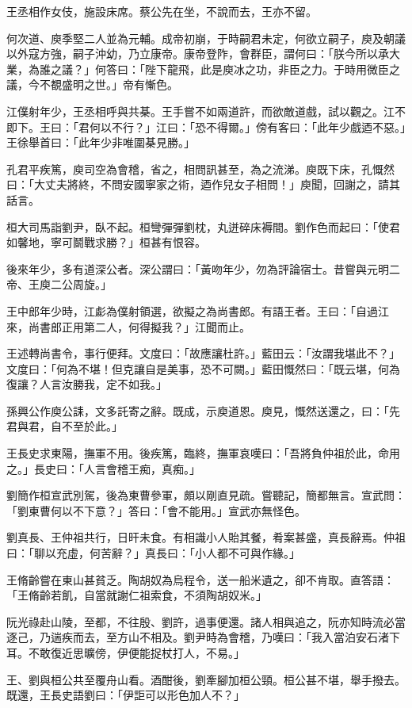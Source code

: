 王丞相作女伎，施設床席。蔡公先在坐，不說而去，王亦不留。

何次道、庾季堅二人並為元輔。成帝初崩，于時嗣君未定，何欲立嗣子，庾及朝議以外寇方強，嗣子沖幼，乃立康帝。康帝登阼，會群臣，謂何曰：「朕今所以承大業，為誰之議？」何答曰：「陛下龍飛，此是庾冰之功，非臣之力。于時用微臣之議，今不覩盛明之世。」帝有慚色。

江僕射年少，王丞相呼與共棊。王手嘗不如兩道許，而欲敵道戲，試以觀之。江不即下。王曰：「君何以不行？」江曰：「恐不得爾。」傍有客曰：「此年少戲迺不惡。」王徐舉首曰：「此年少非唯圍棊見勝。」

孔君平疾篤，庾司空為會稽，省之，相問訊甚至，為之流涕。庾既下床，孔慨然曰：「大丈夫將終，不問安國寧家之術，迺作兒女子相問！」庾聞，回謝之，請其話言。

桓大司馬詣劉尹，臥不起。桓彎彈彈劉枕，丸迸碎床褥間。劉作色而起曰：「使君如馨地，寧可鬬戰求勝？」桓甚有恨容。

後來年少，多有道深公者。深公謂曰：「黃吻年少，勿為評論宿士。昔嘗與元明二帝、王庾二公周旋。」

王中郎年少時，江虨為僕射領選，欲擬之為尚書郎。有語王者。王曰：「自過江來，尚書郎正用第二人，何得擬我？」江聞而止。

王述轉尚書令，事行便拜。文度曰：「故應讓杜許。」藍田云：「汝謂我堪此不？」文度曰：「何為不堪！但克讓自是美事，恐不可闕。」藍田慨然曰：「既云堪，何為復讓？人言汝勝我，定不如我。」

孫興公作庾公誄，文多託寄之辭。既成，示庾道恩。庾見，慨然送還之，曰：「先君與君，自不至於此。」

王長史求東陽，撫軍不用。後疾篤，臨終，撫軍哀嘆曰：「吾將負仲祖於此，命用之。」長史曰：「人言會稽王痴，真痴。」

劉簡作桓宣武別駕，後為東曹參軍，頗以剛直見疏。嘗聽記，簡都無言。宣武問：「劉東曹何以不下意？」答曰：「會不能用。」宣武亦無怪色。

劉真長、王仲祖共行，日旰未食。有相識小人貽其餐，肴案甚盛，真長辭焉。仲祖曰：「聊以充虛，何苦辭？」真長曰：「小人都不可與作緣。」

王脩齡嘗在東山甚貧乏。陶胡奴為烏程令，送一船米遺之，卻不肯取。直答語：「王脩齡若飢，自當就謝仁祖索食，不須陶胡奴米。」

阮光祿赴山陵，至都，不往殷、劉許，過事便還。諸人相與追之，阮亦知時流必當逐己，乃遄疾而去，至方山不相及。劉尹時為會稽，乃嘆曰：「我入當泊安石渚下耳。不敢復近思曠傍，伊便能捉杖打人，不易。」

王、劉與桓公共至覆舟山看。酒酣後，劉牽腳加桓公頸。桓公甚不堪，舉手撥去。既還，王長史語劉曰：「伊詎可以形色加人不？」

